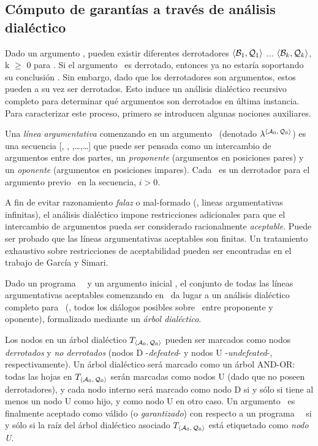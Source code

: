 \subsection{Cómputo de garantías a través de análisis dialéctico}
 \label{sub:computo_garantias}
 
 Dado un argumento \AQ, pueden existir diferentes derrotadores $\mbox{$\langle \mbox{${\mathcal B_1}$},\mbox{${\mathcal Q_1}$} \rangle $}$
 $\ldots$ $\mbox{$\langle \mbox{${\mathcal B_k}$},\mbox{${\mathcal Q_k}$} \rangle $}$, k $\ge$ 0 para \AQ. Si el argumento \AQ\ es
 derrotado, entonces ya no estaría soportando su conclusión \ArgQ.  Sin
 embargo, dado que los derrotadores son argumentos, estos pueden a su
 vez ser derrotados. Esto  induce un análisis dialéctico recursivo
 completo para determinar qué argumentos son derrotados en  última
 instancia. Para caracterizar este proceso, primero se introducen
 algunas nociones auxiliares.
 
 Una \textit{línea argumentativa} comenzando en un argumento \AoQo\
 (denotado $\lambda^{\scriptsize \mbox{$\langle \mbox{${\mathcal A_0}$},\mbox{${\mathcal Q_0}$} \rangle $}}$) es una secuencia [\AoQo,
 \AaQa, \AbQb,\ldots,\AnQn\ldots] que puede ser pensada como un
 intercambio de  argumentos entre dos partes, un \textit{proponente}
 (argumentos en posiciones pares) y un \textit{oponente} (argumentos en
 posiciones impares). Cada \AiQi\ es un derrotador para el argumento
 previo \AimQim\ en la secuencia, $i > 0$.
 
 A fin de evitar razonamiento \textit{falaz} o mal-formado (\eg ,
 lineas argumentativas infinitas), el  análisis dialéctico impone
 restricciones adicionales para que el intercambio de argumentos pueda
 ser  considerado racionalmente \textit{aceptable}. Puede ser probado
 que las líneas argumentativas aceptables  son finitas. Un tratamiento
 exhaustivo sobre restricciones de aceptabilidad pueden ser encontradas
 en el trabajo de García y Simari\cite{delp04}.
 
 Dado un programa \DLP\ \PP\ y un argumento inicial \AoQo, el conjunto
 de todas las líneas argumentativas aceptables comenzando en \AoQo\ da
 lugar a un análisis dialéctico completo para \AoQo\ (\ie, todos los
 diálogos posibles sobre \AoQo\ entre proponente y oponente),
 formalizado mediante un \textit{árbol dialéctico}.
 
 Los nodos en un árbol dialéctico $T_{\scriptsize \mbox{$\langle \mbox{${\mathcal A_0}$},\mbox{${\mathcal Q_0}$} \rangle $}}$ pueden ser
 marcados como nodos \textit{derrotados}  y \textit{no derrotados}
 (nodos D -\textit{defeated}- y nodos U -\textit{undefeated}-,
 respectivamente).  Un árbol dialéctico será marcado como un árbol
 {\footnotesize AND-OR}: todas las hojas en  $T_{\scriptsize \mbox{$\langle \mbox{${\mathcal A_0}$},\mbox{${\mathcal Q_0}$} \rangle $}}$
 serán marcadas como nodos U (dado que no poseen derrotadores), y cada
 nodo interno  será marcado como nodo D si y sólo si tiene al menos un
 nodo U como hijo, y como nodo U en otro caso.  Un argumento \AoQo\ es
 finalmente aceptado como válido (o \textit{garantizado}) con respecto
 a un programa  \DLP\ \PP\  si y sólo si la raíz del árbol dialéctico
 asociado $T_{\scriptsize \mbox{$\langle \mbox{${\mathcal A_0}$},\mbox{${\mathcal Q_0}$} \rangle $}}$ está etiquetado como \textit{nodo U}.
 
